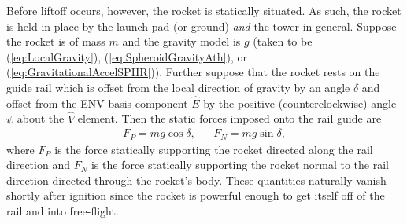 \documentclass[11pt,dvipsnames]{thesis}
\begin{document}
Before liftoff occurs, however, the rocket is statically situated. As such, the rocket is held in place by the launch pad (or ground) \textit{and} the tower in general. Suppose the rocket is of mass $m$ and the gravity model is $g$ (taken to be (\ref{eq:LocalGravity}), (\ref{eq:SpheroidGravityAth}), or (\ref{eq:GravitationalAccelSPHR})). 
Further suppose that the rocket rests on the guide rail which is offset from the local direction of gravity by an angle $\delta$ and offset from the ENV basis component $\widehat{E}$ by the positive (counterclockwise) angle $\psi$ about the $\widehat{V}$ element. 
Then the static forces imposed onto the rail guide are
\begin{align}
F_P = mg\cos\delta, && F_N = mg\sin\delta, \label{eq:PrelaunchStaticForces}
\end{align}
where $F_P$ is the force statically supporting the rocket directed along the rail direction and $F_N$ is the force statically supporting the rocket normal to the rail direction directed through the rocket's body.
These quantities naturally vanish shortly after ignition since the rocket is powerful enough to get itself off of the rail and into free-flight.
\end{document}
